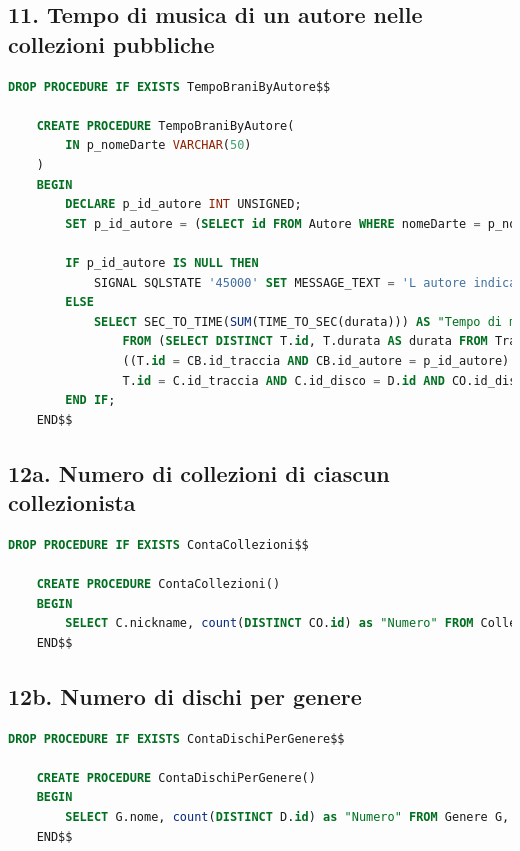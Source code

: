 \documentclass{article}
\begin{document}
\subsection*{11. Tempo di musica di un autore nelle collezioni pubbliche}
\begin{lstlisting}[language=SQL]
    DROP PROCEDURE IF EXISTS TempoBraniByAutore$$
    
    CREATE PROCEDURE TempoBraniByAutore(
        IN p_nomeDarte VARCHAR(50)
    )
    BEGIN
        DECLARE p_id_autore INT UNSIGNED;
        SET p_id_autore = (SELECT id FROM Autore WHERE nomeDarte = p_nomeDarte);
        
        IF p_id_autore IS NULL THEN
            SIGNAL SQLSTATE '45000' SET MESSAGE_TEXT = 'L autore indicato non esiste';
        ELSE
            SELECT SEC_TO_TIME(SUM(TIME_TO_SEC(durata))) AS "Tempo di musica"
                FROM (SELECT DISTINCT T.id, T.durata AS durata FROM Traccia T, Disco D, Contiene C, Collezione CZ, Copia CO, Contribuisce CB, Collabora CL WHERE 
                ((T.id = CB.id_traccia AND CB.id_autore = p_id_autore) OR (D.id = CL.id_disco AND CL.id_autore = p_id_autore AND T.id = C.id_traccia AND C.id_disco = D.id) OR (D.id_autore = p_id_autore AND T.id = C.id_traccia AND C.id_disco = D.id)) AND 
                T.id = C.id_traccia AND C.id_disco = D.id AND CO.id_disco = D.id AND CO.id_collezione = CZ.id AND CZ.isPubblica = true) as SubQuery;
        END IF;
    END$$
\end{lstlisting}

\subsection*{12a. Numero di collezioni di ciascun collezionista}
\begin{lstlisting}[language=SQL]
    DROP PROCEDURE IF EXISTS ContaCollezioni$$ 

    CREATE PROCEDURE ContaCollezioni()
    BEGIN
        SELECT C.nickname, count(DISTINCT CO.id) as "Numero" FROM Collezionista C, Collezione CO WHERE CO.id_collezionista = C.id GROUP BY C.id;
    END$$
\end{lstlisting}

\subsection*{12b. Numero di dischi per genere}
\begin{lstlisting}[language=SQL]
    DROP PROCEDURE IF EXISTS ContaDischiPerGenere$$

    CREATE PROCEDURE ContaDischiPerGenere()
    BEGIN
        SELECT G.nome, count(DISTINCT D.id) as "Numero" FROM Genere G, Classifica C, Disco D WHERE C.id_disco = D.id AND C.nome_genere = G.nome GROUP BY G.nome;
    END$$
\end{lstlisting}
\end{document}
